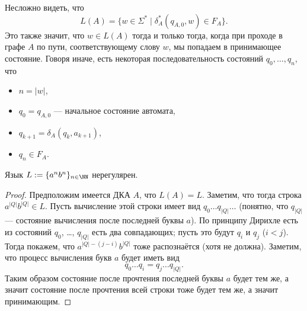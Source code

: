 \documentclass[12pt,a4paper]{article}
\begin{document}
    \begin{remark*}
        Несложно видеть, что
        \[L(A) = \{w \in \Sigma^* \mid \delta^*_A(q_{A, 0}, w) \in F_A\}.\]
        Это также значит, что $w \in L(A)$ тогда и только тогда, когда при проходе в графе $A$ по пути, соответствующему слову $w$, мы попадаем в принимающее состояние. Говоря иначе, есть некоторая последовательность состояний $q_0, \dots, q_n$, что
        \begin{itemize}
            \item $n = |w|$,
            \item $q_0 = q_{A, 0}$ --- начальное состояние автомата,
            \item $q_{k+1} = \delta_A(q_k, a_{k+1})$,
            \item $q_n \in F_A$.
        \end{itemize}
    \end{remark*}

    \begin{theorem}
        Язык $L := \{a^n b^n\}_{n \in \NN}$ нерегулярен.
    \end{theorem}

    \begin{proof}
        Предположим имеется ДКА $A$, что $L(A) = L$. Заметим, что тогда строка $a^{|Q|} b^{|Q|} \in L$. Пусть вычисление этой строки имеет вид $q_0 \dots q_{|Q|} \dots$ (понятно, что $q_{|Q|}$ --- состояние вычисления после последней буквы $a$). По принципу Дирихле есть из состояний $q_0$, \dots, $q_{|Q|}$ есть два совпадающих; пусть это будут $q_i$ и $q_j$ ($i < j$). Тогда покажем, что $a^{|Q| - (j-i)} b^{|Q|}$ тоже распознаётся (хотя не должна). Заметим, что процесс вычисления букв $a$ будет иметь вид
        \[q_0 \dots q_i = q_j \dots q_{|Q|}.\]
        Таким образом состояние после прочтения последней буквы $a$ будет тем же, а значит состояние после прочтения всей строки тоже будет тем же, а значит принимающим.
    \end{proof}
\end{document}
